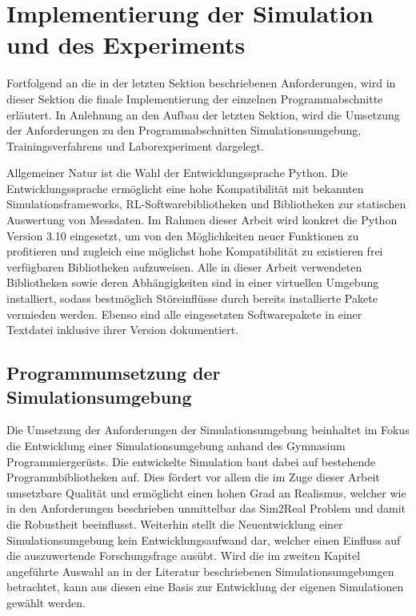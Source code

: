 \section{Implementierung der Simulation und des Experiments}

Fortfolgend an die in der letzten Sektion beschriebenen Anforderungen, wird in dieser Sektion die finale Implementierung der einzelnen Programmabschnitte erläutert.
In Anlehnung an den Aufbau der letzten Sektion, wird die Umsetzung der Anforderungen zu den Programmabschnitten Simulationsumgebung, Trainingsverfahrens und Laborexperiment dargelegt.

Allgemeiner Natur ist die Wahl der Entwicklungssprache Python.
Die Entwicklungssprache ermöglicht eine hohe Kompatibilität mit bekannten Simulationsframeworks, RL-Softwarebibliotheken und Bibliotheken zur statischen Auswertung von Messdaten.
Im Rahmen dieser Arbeit wird konkret die Python Version 3.10 eingesetzt, um von den Möglichkeiten neuer Funktionen zu profitieren und zugleich eine möglichst hohe Kompatibilität zu existieren frei verfügbaren Bibliotheken aufzuweisen.
Alle in dieser Arbeit verwendeten Bibliotheken sowie deren Abhängigkeiten sind in einer virtuellen Umgebung installiert, sodass bestmöglich Störeinflüsse durch bereits installierte Pakete vermieden werden.
Ebenso sind alle eingesetzten Softwarepakete in einer Textdatei inklusive ihrer Version dokumentiert.

\subsection{Programmumsetzung der Simulationsumgebung}

Die Umsetzung der Anforderungen der Simulationsumgebung beinhaltet im Fokus die Entwicklung einer Simulationsumgebung anhand des Gymnasium Programmiergerüsts.
Die entwickelte Simulation baut dabei auf bestehende Programmbibliotheken auf.
Dies fördert vor allem die im Zuge dieser Arbeit umsetzbare Qualität und ermöglicht einen hohen Grad an Realismus, welcher wie in den Anforderungen beschrieben unmittelbar das Sim2Real Problem und damit die Robustheit beeinflusst.
Weiterhin stellt die Neuentwicklung einer Simulationsumgebung kein Entwicklungsaufwand dar, welcher einen Einfluss auf die auszuwertende Forschungsfrage ausübt.
Wird die im zweiten Kapitel angeführte Auswahl an in der Literatur beschriebenen Simulationsumgebungen betrachtet, kann aus diesen eine Basis zur Entwicklung der eigenen Simulationen gewählt werden.

